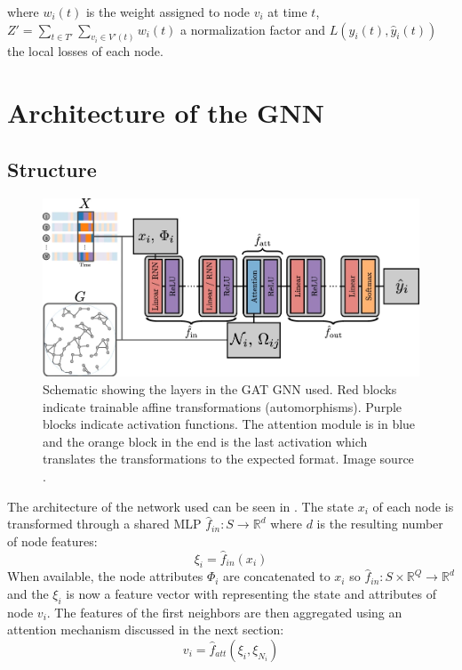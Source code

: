 where $w_i(t)$ is the weight assigned to node $v_i$ at time $t$,
$Z'=\sum_{t \in T'} \sum_{v_i \in V'(t)}w_i(t)$ a normalization factor
and $L(y_i(t), \hat{y}_i(t))$ the local losses of each node.

\section{Architecture of the GNN}

\subsection{Structure}
\begin{figure}[H]
  \centering
  \includegraphics[width=\textwidth]{Figures/chap_exp/GATArch.png}
  \caption[The GAT GNN Architecture]{Schematic showing the layers in the GAT GNN used. Red blocks indicate trainable affine transformations (automorphisms). Purple blocks indicate activation functions. The attention module is in blue and the orange block in the end is the last activation which translates the transformations to the expected format. Image source \cite{murphy}.}
  \label{fig:GATGNN}
\end{figure}

The architecture of the network used can be seen in .
The state $x_i$ of each node is transformed through a shared MLP
$\hat{f}_{in} : S \rightarrow \mathbb{R}^d$ where $d$ is the resulting
number of node features:
\begin{equation}
  \label{eq:input_layer}
  \xi_i = \hat{f}_{in}(x_i)
\end{equation}
When available, the node attributes $\Phi_i$ are concatenated to $x_i$
so $\hat{f}_{in}: S \times \mathbb{R}^Q \rightarrow \mathbb{R}^d$ and the
$\xi_i$ is now a feature vector with representing the state and attributes of node $v_i$.
The features of the first neighbors are then aggregated using an attention mechanism
discussed in the next section:
\begin{equation}
  \label{eq:first_att}
  v_i = \hat{f}_{att} (\xi_i, \xi_{N_i})
\end{equation}

